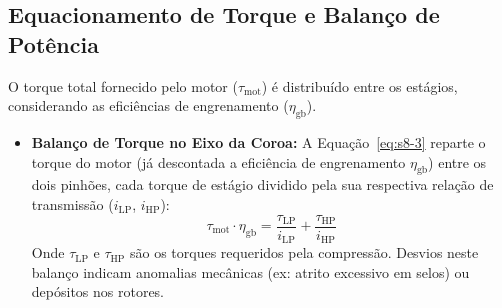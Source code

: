 \documentclass[12pt,a4paper]{article}
\numberwithin{equation}{section}
\numberwithin{table}{section}
\numberwithin{figure}{section}
\begin{document}
	\subsection{\textbf{Equacionamento de Torque e Balanço de Potência}}
	O torque total fornecido pelo motor ($\tau_{\text{mot}}$) é distribuído entre os estágios, considerando as eficiências de engrenamento ($\eta_{\text{gb}}$).
	\begin{itemize}
		\item \textbf{Balanço de Torque no Eixo da Coroa:} A Equação~\eqref{eq:s8-3} reparte o torque do motor (já descontada a eficiência de engrenamento $\eta_{\text{gb}}$) entre os dois pinhões, cada torque de estágio dividido pela sua respectiva relação de transmissão ($i_{\text{LP}}$, $i_{\text{HP}}$):
		\begin{equation}\label{eq:s8-3}
 \tau_{\text{mot}} \cdot \eta_{\text{gb}} = \frac{\tau_{\text{LP}}}{i_{\text{LP}}} + \frac{\tau_{\text{HP}}}{i_{\text{HP}}}
\end{equation}
		Onde $\tau_{\text{LP}}$ e $\tau_{\text{HP}}$ são os torques requeridos pela compressão. Desvios neste balanço indicam anomalias mecânicas (ex: atrito excessivo em selos) ou depósitos nos rotores.
	\end{itemize}
	
\end{document}
